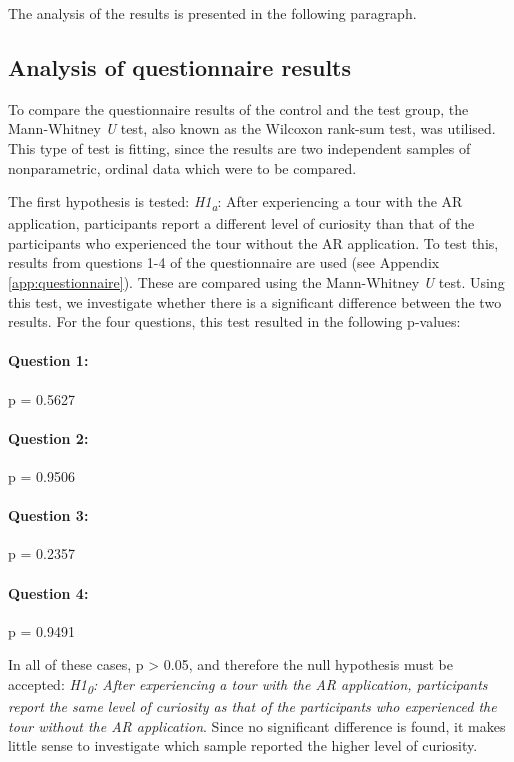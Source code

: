 The analysis of the results is presented in the following paragraph.

\subsection{Analysis of questionnaire results}\label{sec:questionnaire_analysis}
To compare the questionnaire results of the control and the test group, the Mann-Whitney \textit{U} test, also known as the Wilcoxon rank-sum test, was utilised. This type of test is fitting, since the results are two independent samples of nonparametric, ordinal data which were to be compared.
 
The first hypothesis is tested: \textit{H1\textsubscript{a}}: After experiencing a tour with the AR application, participants report a different level of curiosity than that of the participants who experienced the tour without the AR application. To test this, results from questions 1-4 of the questionnaire are used (see Appendix \ref{app:questionnaire}). These are compared using the Mann-Whitney \textit{U} test. Using this test, we investigate whether there is a significant difference between the two results. For the four questions, this test resulted in the following p-values:

\paragraph{Question 1:} p = 0.5627
\paragraph{Question 2:} p = 0.9506
\paragraph{Question 3:} p = 0.2357
\paragraph{Question 4:} p = 0.9491

In all of these cases, p > 0.05, and therefore the null hypothesis must be accepted: \textit{H1\textsubscript{0}: After experiencing a tour with the AR application, participants report the same level of curiosity as that of the participants who experienced the tour without the AR application}. Since no significant difference is found, it makes little sense to investigate which sample reported the higher level of curiosity.

